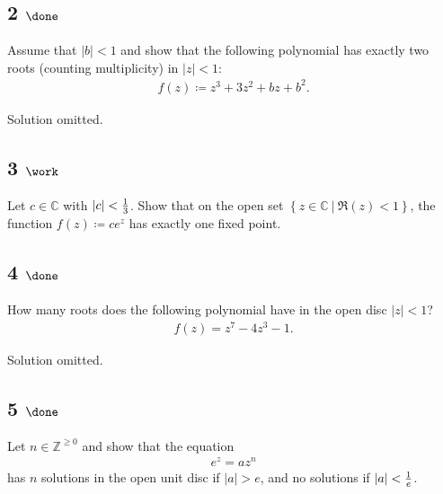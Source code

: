 \hypertarget{done-10}{%
\subsection{\texorpdfstring{2
\(\done\)}{2 \textbackslash done}}\label{done-10}}

Assume that \({\left\lvert {b} \right\rvert} < 1\) and show that the
following polynomial has exactly two roots (counting multiplicity) in
\({\left\lvert {z} \right\rvert} < 1\):
\begin{align*}
f(z) \coloneqq z^3 + 3z^2 + bz + b^2
.\end{align*}

Solution omitted.

\hypertarget{work-64}{%
\subsection{\texorpdfstring{3
\(\work\)}{3 \textbackslash work}}\label{work-64}}

Let \(c\in {\mathbb{C}}\) with
\({\left\lvert {c} \right\rvert} < {1\over 3}\). Show that on the open
set \(\left\{{z\in {\mathbb{C}}{~\mathrel{\Big|}~}\Re(z) < 1}\right\}\),
the function \(f(z) \coloneqq ce^z\) has exactly one fixed point.

\hypertarget{done-11}{%
\subsection{\texorpdfstring{4
\(\done\)}{4 \textbackslash done}}\label{done-11}}

How many roots does the following polynomial have in the open disc
\({\left\lvert {z} \right\rvert} < 1\)?
\begin{align*}
f(z) = z^7 - 4z^3 - 1
.\end{align*}

Solution omitted.

\hypertarget{done-12}{%
\subsection{\texorpdfstring{5
\(\done\)}{5 \textbackslash done}}\label{done-12}}

Let \(n\in {\mathbb{Z}}^{\geq 0}\) and show that the equation
\begin{align*}
e^z = az^n
\end{align*}
has \(n\) solutions in the open unit disc if
\({\left\lvert {a} \right\rvert} > e\), and no solutions if
\({\left\lvert {a} \right\rvert} < {1\over e}\).

